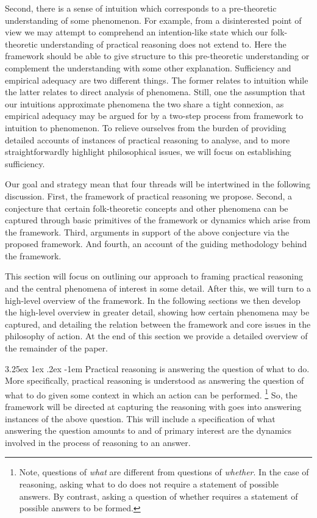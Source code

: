 \documentclass[10pt]{article}
\makeatletter
\renewcommand\paragraph{\@startsection{paragraph}{5}{\z@}%
  {3.25ex \@plus1ex \@minus.2ex}%
  {-1em}%
  {\normalfont\normalsize\bfseries}}
\makeatother
\begin{document}
Second, there is a sense of intuition which corresponds to a pre-theoretic understanding of some phenomenon.
For example, from a disinterested point of view we may attempt to comprehend an intention-like state which our folk-theoretic understanding of practical reasoning does not extend to.
Here the framework should be able to give structure to this pre-theoretic understanding or complement the understanding with some other explanation.
Sufficiency and empirical adequacy are two different things.
The former relates to intuition while the latter relates to direct analysis of phenomena.
Still, one the assumption that our intuitions approximate phenomena the two share a tight connexion, as empirical adequacy may be argued for by a two-step process from framework to intuition to phenomenon.
To relieve ourselves from the burden of providing detailed accounts of instances of practical reasoning to analyse, and to more straightforwardly highlight philosophical issues, we will focus on establishing sufficiency.

Our goal and strategy mean that four threads will be intertwined in the following discussion.
First, the framework of practical reasoning we propose.
Second, a conjecture that certain folk-theoretic concepts and other phenomena can be captured through basic primitives of the framework or dynamics which arise from the framework.
Third, arguments in support of the above conjecture via the proposed framework.
And fourth, an account of the guiding methodology behind the framework.

This section will focus on outlining our approach to framing practical reasoning and the central phenomena of interest in some detail.
After this, we will turn to a high-level overview of the framework.
In the following sections we then develop the high-level overview in greater detail, showing how certain phenomena may be captured, and detailing the relation between the framework and core issues in the philosophy of action.
At the end of this section we provide a detailed overview of the remainder of the paper.

\paragraph{ }
Practical reasoning is answering the question of what to do.
More specifically, practical reasoning is understood as answering the question of what to do given some context in which an action can be performed.\nolinebreak
\footnote{Note, questions of \emph{what} are different from questions of \emph{whether}.
  In the case of reasoning, asking what to do does not require a statement of possible answers.
  By contrast, asking a question of whether requires a statement of possible answers to be formed.}
So, the framework will be directed at capturing the reasoning with goes into answering instances of the above question.
This will include a specification of what answering the question amounts to and of primary interest are the dynamics involved in the process of reasoning to an answer.
\end{document}
